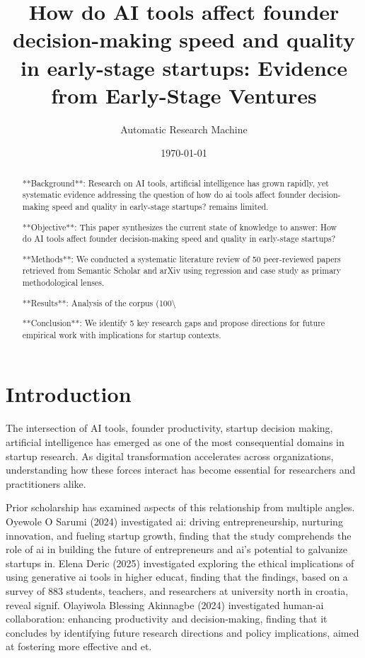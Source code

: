 \documentclass[11pt, a4paper]{article}
\title{How do AI tools affect founder decision-making speed and quality in early-stage startups: Evidence from Early-Stage Ventures}
\author{Automatic Research Machine}
\date{\today}
\begin{document}
\maketitle

\begin{abstract}
**Background**: Research on AI tools, artificial intelligence has grown rapidly, yet systematic evidence addressing the question of how do ai tools affect founder decision-making speed and quality in early-stage startups? remains limited.

**Objective**: This paper synthesizes the current state of knowledge to answer: How do AI tools affect founder decision-making speed and quality in early-stage startups?

**Methods**: We conducted a systematic literature review of 50 peer-reviewed papers retrieved from Semantic Scholar and arXiv using regression and case study as primary methodological lenses.

**Results**: Analysis of the corpus (100\textbackslash{}%

**Conclusion**: We identify 5 key research gaps and propose directions for future empirical work with implications for startup contexts.
\end{abstract}

\section{Introduction}
The intersection of AI tools, founder productivity, startup decision making, artificial intelligence has emerged as one of the most consequential domains in startup research. As digital transformation accelerates across organizations, understanding how these forces interact has become essential for researchers and practitioners alike.

Prior scholarship has examined aspects of this relationship from multiple angles. Oyewole O Sarumi (2024) investigated ai: driving entrepreneurship, nurturing innovation, and fueling startup growth, finding that the study comprehends the role of ai in building
the future of entrepreneurs and ai's potential to
galvanize startups in. Elena Deric (2025) investigated exploring the ethical implications of using generative ai tools in higher educat, finding that the findings, based on a survey of 883 students, teachers, and researchers at university north in croatia, reveal signif. Olayiwola Blessing Akinnagbe (2024) investigated human-ai collaboration: enhancing productivity and decision-making, finding that it concludes by identifying future research directions and policy implications, aimed at fostering more effective and et. 
\end{document}
